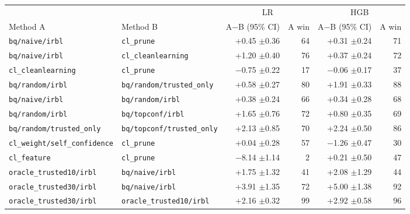 \begin{tabular}{llrrrr}
\toprule
 & & \multicolumn{2}{c}{LR} & \multicolumn{2}{c}{HGB} \\
\cmidrule(lr){3-4} \cmidrule(lr){5-6}
Method A & Method B & A$-$B (95\% CI) & A win & A$-$B (95\% CI) & A win \\
\midrule
\texttt{bq/naive/irbl} & \texttt{cl\_prune} & +0.45 {\scriptsize$\pm$0.36} & 64 & +0.31 {\scriptsize$\pm$0.24} & 71 \\
\texttt{bq/naive/irbl} & \texttt{cl\_cleanlearning} & +1.20 {\scriptsize$\pm$0.40} & 76 & +0.37 {\scriptsize$\pm$0.24} & 72 \\
\texttt{cl\_cleanlearning} & \texttt{cl\_prune} & $-$0.75 {\scriptsize$\pm$0.22} & 17 & $-$0.06 {\scriptsize$\pm$0.17} & 37 \\
\texttt{bq/random/irbl} & \texttt{bq/random/trusted\_only} & +0.58 {\scriptsize$\pm$0.27} & 80 & +1.91 {\scriptsize$\pm$0.33} & 88 \\
\texttt{bq/naive/irbl} & \texttt{bq/random/irbl} & +0.38 {\scriptsize$\pm$0.24} & 66 & +0.34 {\scriptsize$\pm$0.28} & 68 \\
\texttt{bq/random/irbl} & \texttt{bq/topconf/irbl} & +1.65 {\scriptsize$\pm$0.76} & 72 & +0.80 {\scriptsize$\pm$0.35} & 69 \\
\texttt{bq/random/trusted\_only} & \texttt{bq/topconf/trusted\_only} & +2.13 {\scriptsize$\pm$0.85} & 70 & +2.24 {\scriptsize$\pm$0.50} & 86 \\
\texttt{cl\_weight/self\_confidence} & \texttt{cl\_prune} & +0.04 {\scriptsize$\pm$0.28} & 57 & $-$1.26 {\scriptsize$\pm$0.47} & 30 \\
\texttt{cl\_feature} & \texttt{cl\_prune} & $-$8.14 {\scriptsize$\pm$1.14} & 2 & +0.21 {\scriptsize$\pm$0.50} & 47 \\
\texttt{oracle\_trusted10/irbl} & \texttt{bq/naive/irbl} & +1.75 {\scriptsize$\pm$1.32} & 41 & +2.08 {\scriptsize$\pm$1.29} & 44 \\
\texttt{oracle\_trusted30/irbl} & \texttt{bq/naive/irbl} & +3.91 {\scriptsize$\pm$1.35} & 72 & +5.00 {\scriptsize$\pm$1.38} & 92 \\
\texttt{oracle\_trusted30/irbl} & \texttt{oracle\_trusted10/irbl} & +2.16 {\scriptsize$\pm$0.32} & 99 & +2.92 {\scriptsize$\pm$0.58} & 96 \\
\bottomrule
\end{tabular}
